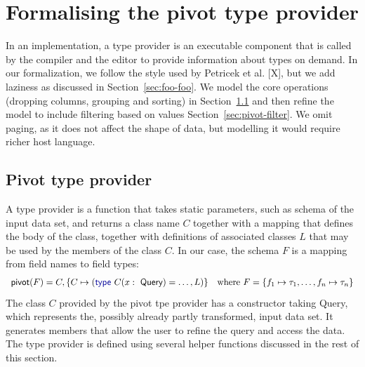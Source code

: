 \documentclass[a4paper,UKenglish]{lipics-v2016}
\theoremstyle{plain}
\theoremstyle{definition}
\newcommand{\kvd}[1]{\textnormal{\textcolor{kvdclr}{\sffamily #1}}}
\newcommand{\ident}[1]{\textnormal{\sffamily #1}}
\begin{document}

\section{Formalising the pivot type provider}
\label{sec:pivot}

In an implementation, a type provider is an executable component that is called by the compiler
and the editor to provide information about types on demand. In our formalization, we follow the 
style used by Petricek et al. [X], but we add laziness as discussed in Section~\ref{sec:foo-foo}.
We model the core operations (dropping columns, grouping and sorting) in Section~\ref{sec:pivot-core}
and then refine the model to include filtering based on values Section~\ref{sec:pivot-filter}.
We omit paging, as it does not affect the shape of data, but modelling it would require richer 
host language.


\subsection{Pivot type provider}
\label{sec:pivot-core}

A type provider is a function that takes static parameters, such as schema of the input data set, 
and returns a class name $C$ together with a mapping that defines the body of the class, together 
with definitions of associated classes $L$ that may be used by the members of the class $C$. 
In our case, the schema $F$ is a mapping from field names to field types:
%
\begin{equation*}
\begin{array}{l}
\ident{pivot}(F) = C, \{ C \mapsto (\kvd{type}~C(x:\ident{Query}) = \ldots,L) \} \quad \textnormal{where}~F=\{ f_1 \mapsto \tau_1, \ldots, f_n \mapsto \tau_n \}
\end{array}
\end{equation*}
%
The class $C$ provided by the pivot tpe provider has a constructor taking \ident{Query}, which 
represents the, possibly already partly transformed, input data set. It generates members that
allow the user to refine the query and access the data. The type provider is defined using several
helper functions discussed in the rest of this section.
\end{document}
